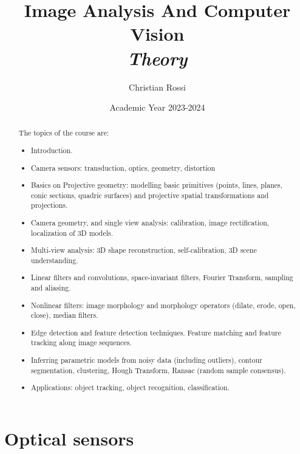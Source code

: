 \documentclass[12pt, a4paper]{report}
\title{Image Analysis And Computer Vision \\ \textit{Theory}}
\author{Christian Rossi}
\date{Academic Year 2023-2024}
\begin{document}
\maketitle

\newpage

\begin{abstract}
    The topics of the course are: 
    \begin{itemize}
        \item Introduction.
        \item Camera sensors: transduction, optics, geometry, distortion
        \item Basics on Projective geometry: modelling basic primitives (points, lines, planes, conic sections, quadric surfaces) and projective spatial transformations and  projections.
        \item Camera geometry, and single view analysis: calibration, image rectification, localization of 3D models.
        \item Multi-view analysis: 3D shape reconstruction, self-calibration, 3D scene understanding.
        \item Linear filters and convolutions, space-invariant filters, Fourier Transform, sampling and aliasing. 
        \item Nonlinear filters: image morphology and morphology operators (dilate, erode, open, close), median filters.
        \item Edge detection and feature detection techniques. Feature matching and feature tracking along image sequences.
        \item Inferring parametric models from noisy data (including outliers), contour segmentation, clustering, Hough Transform, Ransac (random sample consensus). 
        \item Applications: object tracking, object recognition, classification.
    \end{itemize}
\end{abstract}

\newpage

\tableofcontents

\newpage

\chapter{Optical sensors}
\end{document}
